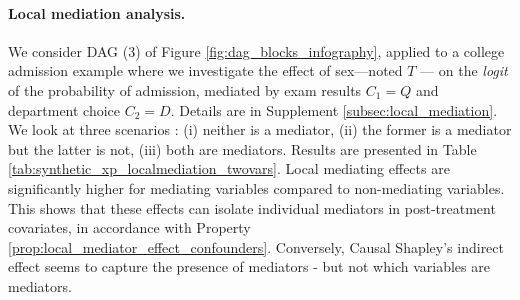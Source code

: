\documentclass{article}
\theoremstyle{plain}
\theoremstyle{definition}
\theoremstyle{remark}
\theoremstyle{mystyle}
\begin{document}
\paragraph{Local mediation analysis.} We consider DAG (3) of Figure \ref{fig:dag_blocks_infography}, applied to a college admission example where we investigate the effect of sex---noted $T$ --- on the \textit{logit} of the probability of admission, mediated by exam results $C_1 = Q$ and department choice $C_2 = D$. Details are in Supplement \ref{subsec:local_mediation}.
We look at three scenarios : (i) neither is a mediator, (ii)  the former is a mediator but the latter is not, (iii) both are mediators. Results are presented in Table \ref{tab:synthetic_xp_localmediation_twovars}. Local mediating effects are significantly higher for mediating variables compared to non-mediating variables. This shows that these effects can isolate individual mediators in post-treatment covariates, in accordance with Property \ref{prop:local_mediator_effect_confounders}. Conversely, Causal Shapley's indirect effect seems to capture the presence of mediators - but not which variables are mediators.
\end{document}

